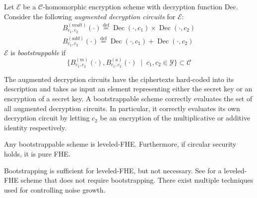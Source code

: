 \begin{definition}
    Let $\mathcal{E}$ be a $\mathcal{C}$-homomorphic encryption scheme with decryption function Dec. Consider the following \textit{augmented decryption circuits} for $\mathcal{E}$:
    \begin{equation*}
    \begin{aligned}        
        B_{c_1,c_2}^{(mult)}(\cdot) \stackrel{\mathrm{def}}{=} \operatorname{Dec}(\cdot, c_1) \times \operatorname{Dec}(\cdot, c_2)\\
        B_{c_1,c_2}^{(add)}(\cdot) \stackrel{\mathrm{def}}{=} \operatorname{Dec}(\cdot, c_1) + \operatorname{Dec}(\cdot, c_2)
    \end{aligned}
    \end{equation*}
    $\mathcal{E}$ is \textit{bootstrappable} if
    \begin{equation*}
    \{B_{c_1,c_2}^{(m)}(\cdot), B_{c_1,c_2}^{(a)}(\cdot) \; \mid \; c_1, c_2 \in \mathcal{Y}\} \subset \mathcal{C}
    \end{equation*}
\end{definition}

The augmented decryption circuits have the ciphertexts hard-coded into its description and takes as input an element representing either the secret key or an encryption of a secret key. A bootstrappable scheme correctly evaluates the set of all augmented decryption circuits. In particular, it correctly evaluates its own decryption circuit by letting $c_2$ be an encryption of the multiplicative or additive identity respectively.

\begin{theorem}
Any bootstrappable scheme is leveled-FHE. Furthermore, if circular security holds, it is pure FHE.
\end{theorem}
\begin{remark}
    Bootstrapping is sufficient for leveled-FHE, but not necessary. See \cite{BGV12-no-bootstrap} for a leveled-FHE scheme that does not require bootstrapping. There exist multiple techniques used for controlling noise growth.
\end{remark}

